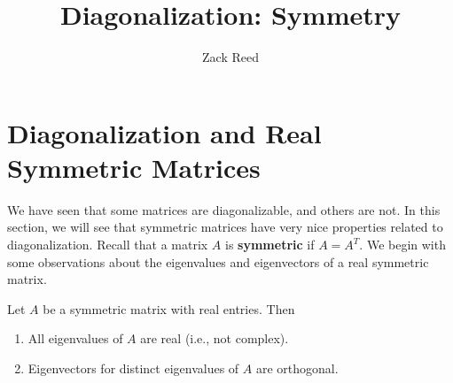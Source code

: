 \documentclass{ximera}
\author{Zack Reed}
\title{Diagonalization: Symmetry}
\begin{document}
\begin{abstract}

\end{abstract}
\maketitle

\section*{Diagonalization and Real Symmetric Matrices}

We have seen that some matrices are diagonalizable, and others are not. In this section, we will see that
symmetric matrices have very nice properties related to diagonalization. Recall that a matrix $A$ is
\textbf{symmetric} if $A=A^T$. We begin with some observations
about the eigenvalues and eigenvectors of a real symmetric matrix.

\begin{proposition}\label{prop:eigenvalues-symmetric}
  Let $A$ be a symmetric matrix with real entries. Then

    \begin{enumerate}
    \item All eigenvalues of $A$ are real (i.e., not complex).
    \item Eigenvectors for distinct eigenvalues of $A$ are orthogonal.
    \end{enumerate}

\end{proposition}
\end{document}
